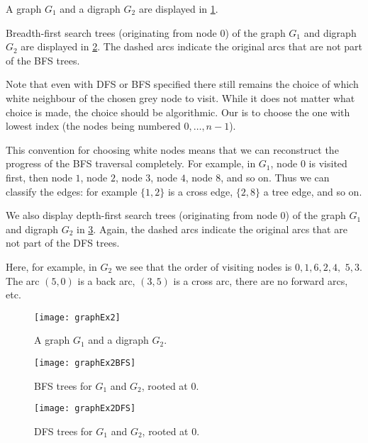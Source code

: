\begin{Example}
\label{eg:graphExample2}

A graph $G_1$ and a digraph $G_2$ are displayed in
\cref{fig:graphExample2}.

Breadth-first search trees (originating from node $0$) of the graph $G_1$
and digraph $G_2$  are displayed in \cref{fig:graphEx2-BFS}. The
dashed arcs indicate the original arcs that are not part of the BFS trees.

Note that even with DFS or BFS specified there still remains the choice
of which white neighbour of the chosen grey node to visit. While it does
not matter what choice is made, the choice should be algorithmic.
Our  is to choose the one with
lowest index (the nodes being numbered $0, \dots, n - 1$). 

This convention for choosing white nodes means that we can
reconstruct the progress of the BFS traversal completely. For example,
in $G_1$, node $0$ is visited first, then node $1$, node $2$, node $3$,
node $4$, node $8$, and so on. Thus we can classify the
edges: for example $\{1, 2\}$ is a cross edge, $\{2, 8\}$ a tree edge,
and so on.

We also display depth-first search trees (originating from node $0$) of
the graph $G_1$ and digraph $G_2$ in \cref{fig:graphEx2-DFS}.
Again, the dashed arcs indicate the original arcs that are not part of
the DFS trees.

Here, for example, in $G_2$ we see that the order of visiting nodes is 
$0, 1, 6, 2, 4,$ $5, 3$. The arc $(5, 0)$ is a back arc, $(3, 5)$ is a
cross arc, there are no forward arcs, etc.

\end{Example}
\begin{figure}[hbtp]
	\centering
	\texttt{[image: graphEx2]}
	\caption{A graph $G_1$ and a digraph $G_2$.}
	\label{fig:graphExample2}
\end{figure}

\begin{figure}[hbtp]
	\centering
	\texttt{[image: graphEx2BFS]}
	\caption{BFS trees for $G_1$ and $G_2$, rooted at $0$.}
	\label{fig:graphEx2-BFS}
\end{figure}

\begin{figure}[hbtp]
	\centering 
	\texttt{[image: graphEx2DFS]}
	\caption{DFS trees for $G_1$ and $G_2$, rooted at $0$.}
	\label{fig:graphEx2-DFS}
\end{figure}

